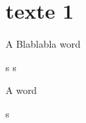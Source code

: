 \documentclass{scrbook}
\begin{document}
\section{texte 1}
\beginnumbering
\pstart
A  Blablabla  word
\pend
\endnumbering

s
s

\beginnumbering
\pstart
A  word
\pend
\endnumbering

s
\end{document}
